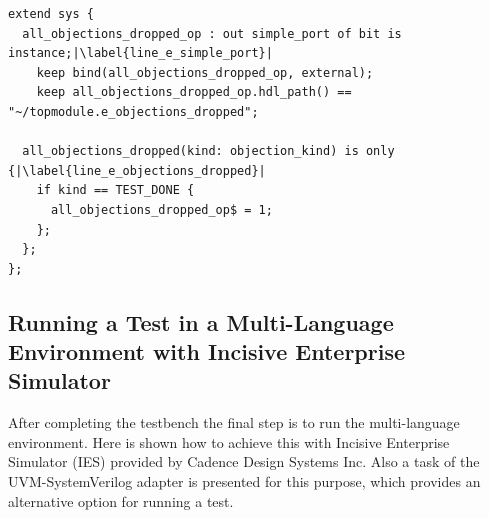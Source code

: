\lstset{language=e, numbers = left, escapechar=|, breaklines=true}
\begin{lstlisting}[frame=htrbl, caption={\textit{e}: signaling master component that all objections are dropped},
label={lst:e_slave_test_end}]
extend sys {
  all_objections_dropped_op : out simple_port of bit is instance;|\label{line_e_simple_port}|
    keep bind(all_objections_dropped_op, external);
    keep all_objections_dropped_op.hdl_path() == "~/topmodule.e_objections_dropped";
    
  all_objections_dropped(kind: objection_kind) is only {|\label{line_e_objections_dropped}|
    if kind == TEST_DONE {
      all_objections_dropped_op$ = 1;
    };
  };
};
\end{lstlisting}
\subsection{Running a Test in a Multi-Language Environment with Incisive Enterprise Simulator}

After completing the testbench the final step is to run the multi-language environment. Here is shown how to achieve
this with Incisive Enterprise Simulator (IES) provided by Cadence Design Systems Inc. Also a task of the
UVM-SystemVerilog adapter is presented for this purpose, which provides an alternative option for running a test.

